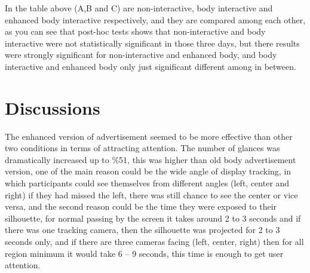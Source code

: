 \begin{enumerate}
\begin{table}[H]
\caption{Post-Hoc Tukey’s HSD}
\label{tab:engage-non-posthoctukey}
\centering
{}
\end{table}
In the table above (A,B and C) are non-interactive, body interactive and enhanced body interactive respectively, and they are compared among each other, as you can see that post-hoc tests shows that non-interactive and body interactive were not statistically significant in those three days, but there results were strongly significant for non-interactive and enhanced body, and body interactive and enhanced body only just significant different among in between. 

\end{enumerate}



\section{Discussions}

The enhanced version of advertisement seemed to be more effective than other two conditions in terms of attracting attention. The number of glances was dramatically increased up to \%51, this was higher than old body advertisement version, one of the main reason could be the wide angle of display tracking, in which participants could see themselves from different angles (left, center and right) if they had missed the left, there was still chance to see the center or vice versa, and the second reason could be the time they were exposed to their silhouette, for normal passing by the screen it takes around 2 to 3 seconds and if there was one tracking camera, then the silhouette was projected for 2 to 3 seconds only, and if there are three cameras facing (left, center, right) then for all region minimum it would take 6 – 9 seconds, this time is enough to get user attention.

